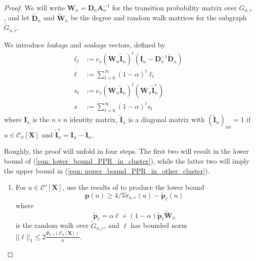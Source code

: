 \documentclass{article}
\let\pprspace\relax
\newcommand{\1}{\mathbf{1}}
\newcommand{\pbf}{\mathbf{p}}
\newcommand{\Abf}{\mathbf{A}}
\newcommand{\Xbf}{\mathbf{X}}
\newcommand{\Wbf}{\mathbf{W}}
\newcommand{\Dbf}{\mathbf{D}}
\newcommand{\Cset}{\mathcal{C}}
\newcommand{\Csig}{\Cset_{\sigma}}
\newcommand{\pprspace}{{\sc PPR~}}
\newcommand{\wDbf}{\widetilde{\Dbf}}
\theoremstyle{aldenthm}
\begin{document}
\begin{proof}
	We will write $\Wbf_n = \Dbf_n \Abf_n^{-1}$ for the transition probability matrix over $G_{n,r}$, and let $\widetilde{\Dbf}_n$ and $\widetilde{\Wbf}_n$ be the degree and random walk matrices for the subgraph $\widetilde{G}_{n,r}$.
	
	We introduce \emph{leakage} and \emph{soakage} vectors, defined by
	\begin{align*}
	\ell_t & := e_v (\Wbf_n \widetilde{\mathbf{I}}_n )^t (\mathbf{I}_n - \Dbf_n^{-1} \wDbf_{n}) \\
	\ell & := \sum_{t = 0}^{\infty} (1 - \alpha)^t \ell_t \\
	s_t & := e_v (\Wbf_n \widetilde{\mathbf{I}}_n )^t (\Wbf_n \widetilde{\mathbf{I}}_n^c) \\
	s & := \sum_{t = 0}^{\infty} (1 - \alpha)^{t} s_t
	\end{align*}
	where $\mathbf{I}_n$ is the $n \times n$ identity matrix, $\widetilde{\mathbf{I}}_n$ is a diagonal matrix with $(\widetilde{\mathbf{I}}_n)_{uu} = 1$ if $u \in \Csig[\Xbf]$ and $\widetilde{\mathbf{I}}_n^c = \mathbf{I}_n - \widetilde{\mathbf{I}}_n$. 
	
	Roughly, the proof will unfold in four steps. The first two will result in the lower bound of (\ref{eqn: lower_bound_PPR_in_cluster}), while the latter two will imply the upper bound in (\ref{eqn: upper_bound_PPR_in_other_cluster}).
	
	\begin{enumerate}
		\item For $u \in \Cset'[\Xbf]$, use the results of \cite{zhu2013} to produce the lower bound 
		\begin{equation*}
		\pbf(u) \geq 4/5 \widetilde{\pi}_{n,r}(u) - \widetilde{\pbf}_{\ell}(u)
		\end{equation*}
		where 
		\begin{equation*}
		\widetilde{\pbf}_{\ell} = \alpha \ell + (1 - \alpha) \widetilde{\pbf}_{\ell} \widetilde{\Wbf}_n
		\end{equation*}
		is the \pprspace random walk over $\widetilde{G}_{n,r}$, and $\ell$ has bounded norm $||\ell||_1 \leq 2\frac{\Phi_{n,r}(\Csig[\Xbf])}{\alpha}$.
		

\end{enumerate}
\end{proof}
\end{document}
